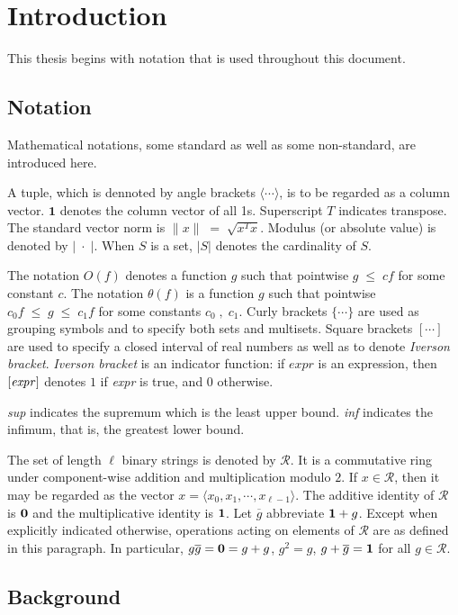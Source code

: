 \chapter{Introduction} \label{ch:introduction}
This thesis begins with notation that is used throughout this document.
\section{Notation}
Mathematical notations, some standard as well as some non-standard, are introduced here.

A tuple, which is dennoted by angle brackets $\langle \cdots \rangle$, is to be regarded as a column
vector. $\bm{1}$ denotes the column vector of all 1s. Superscript $T$ indicates transpose. 
The standard vector norm is $\|x\| \;=\; \sqrt{x^T x}$. Modulus (or absolute value) is denoted by $|\; \cdot \;|$. 
When $S$ is a set, $|S|$ denotes the cardinality of $S$.

The notation $O(f)$ denotes a function $g$ such that pointwise $g \;\leq \;c f$ for some constant $c$. 
The notation $\theta(f)$ is a function $g$ such that pointwise 
$c_0 f \;\leq\; g \;\leq\; c_1 f$ for some constants $c_0 \;,\; c_1$. 
Curly brackets $\{\cdots\}$ are used as grouping symbols and to specify both sets
and multisets. Square brackets $[ \cdots ]$ are used to specify 
a closed interval of real numbers as well as to denote {\em Iverson bracket}. 
{\em Iverson bracket} is an indicator function:
if $expr$ is an expression, then
$[\mbox{\em expr\/} ]$ denotes $1$ if {\em expr\/} is
true, and $0$ otherwise. 

{\em sup \/} indicates the supremum which is the least upper bound. {\em inf \/} indicates the infimum, 
that is, the greatest lower bound.

The set of length $\ell$ binary strings is denoted by $\mathcal{R}$. It is a
commutative ring under component-wise addition and
multiplication modulo $2$. If $x \in \mathcal{R}$, then it may 
be regarded as the vector $x = \langle x_0, x_1, \cdots, x_{\ell - 1} \rangle$. 
The additive identity of $\mathcal{R}$ is ${\bf 0}$ and the
multiplicative identity is ${\bf 1}$. Let $\overline{g}$
abbreviate ${\bf 1} + g$.  Except when explicitly indicated otherwise,
operations acting on elements of $\mathcal{R}$ are as defined in this
paragraph. In particular, $g \overline{g} = {\bf 0} = g+g$,
  $g^2 = g$, $g + \overline{g} = {\bf 1}$ for all $g \in
  \mathcal{R}$.


\section{Background}
